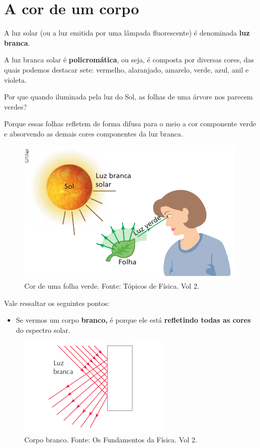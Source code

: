 \documentclass[11pt,twocolumn,oneside]{article}
\begin{document}
\hypertarget{x-a-cor-de-um-corpo}{\section{A cor de um corpo}}
A luz solar (ou a luz emitida por uma lâmpada fluorescente) é denominada \textbf{luz branca}.


A luz branca solar é \textbf{policromática}, ou seja, é composta por diversas cores, das quais podemos destacar sete: vermelho, alaranjado, amarelo, verde, azul, anil e violeta.


Por que quando iluminada pela luz do Sol, as folhas de uma árvore nos parecem verdes?


Porque essas folhas refletem de forma difusa para o meio a cor componente verde e absorvendo as demais cores componentes da luz branca.


\begin{figure}[h]{}
\centering\includegraphics[width=2.5truein]{img10.png}
\caption{Cor de uma folha verde. Fonte: Tópicos de Física. Vol 2.}
\centering
\end{figure}

Vale ressaltar os seguintes pontos:


\begin{itemize}

\item Se vermos um corpo \textbf{branco,} é porque ele está \textbf{refletindo todas as cores} do espectro solar.

\end{itemize}


\begin{figure}[h]{}
\centering\includegraphics[width=2.5truein]{img11.png}
\caption{Corpo branco. Fonte: Os Fundamentos da Física. Vol 2.}
\centering
\end{figure}
\end{document}

